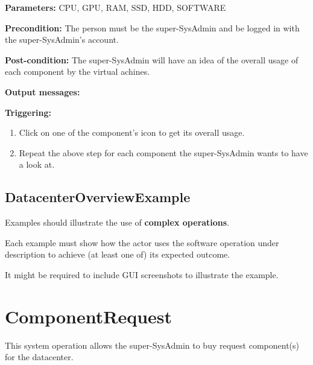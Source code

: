 \begin{description}

\item \textbf{Parameters:} CPU, GPU, RAM, SSD, HDD, SOFTWARE
\item \textbf{Precondition:} The person must be the super-SysAdmin and be logged
in with the super-SysAdmin's account.
\item \textbf{Post-condition:} The super-SysAdmin will have an idea of the
overall usage of each component by the virtual achines.
\item \textbf{Output messages:}

\item \textbf{Triggering:}
\begin{enumerate}
\item Click on one of the component's icon to get its overall usage.
\item Repeat the above step for each component the super-SysAdmin wants to have a
look at.
\end{enumerate}

 
\end{description}

 
\subsection{DatacenterOverviewExample}
Examples should illustrate the use of \textbf{complex operations}.

Each example must show how the actor uses the software operation under
description to achieve (at least one of) its expected outcome.

It might be required to include GUI screenshots to illustrate the example.






\section{ComponentRequest}
\label{operation:componentrequest}
This system operation allows the super-SysAdmin to buy request component(s) for
the datacenter.

